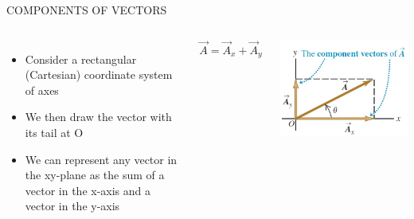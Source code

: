 \documentclass[]{beamer}
\begin{document}
\begin{frame}

COMPONENTS OF VECTORS



\begin{columns}

\begin{itemize}
\item Consider a rectangular (Cartesian) coordinate system of axes \pause

\item We then draw the vector with its tail at O \pause

\item We can represent any vector in the xy-plane as the sum of a vector in the x-axis and a vector 
in the y-axis \pause
\end{itemize}

\begin{equation}
\vec{A}=\vec{A}_x+\vec{A}_y
\end{equation}
\pause


\begin{center}
     \includegraphics[width=1.\textwidth]{images/component_vec.jpg}      
     \end{center}


\end{columns}



\end{frame}

\end{document}
